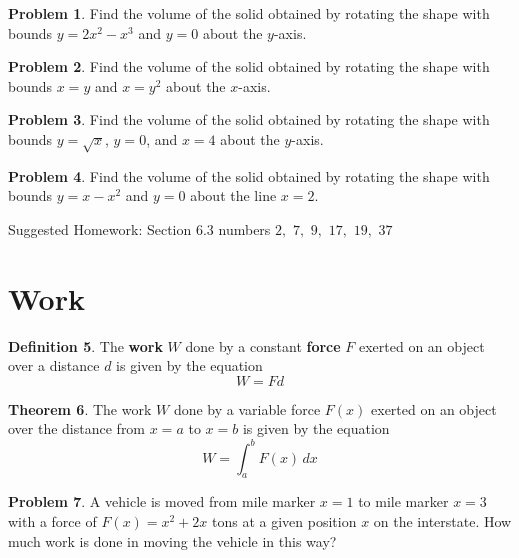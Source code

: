 \documentclass[letterpaper, twoside, 12pt]{book}
\theoremstyle{definition}
\newtheorem{theorem}{Theorem}
\theoremstyle{definition}
\newtheorem{definition}[theorem]{Definition}
\newtheorem{problem}[theorem]{Problem}
\begin{document}
\begin{problem}
 Find the volume of the solid obtained by rotating the shape with bounds
 $y = 2x^2-x^3$ and $y = 0$ about the $y$-axis.
\end{problem}

\vfill

\begin{problem}
 Find the volume of the solid obtained by rotating the shape with bounds
 $x = y$ and $x = y^2$ about the $x$-axis.
\end{problem}

\vfill

\newpage

\begin{problem}
 Find the volume of the solid obtained by rotating the shape with bounds
 $y = \sqrt{x}$, $y=0$, and $x=4$ about the $y$-axis.
\end{problem}

\vfill

\begin{problem}
 Find the volume of the solid obtained by rotating the shape with bounds
 $y = x-x^2$ and $y = 0$ about the line $x=2$.
\end{problem}

\vfill

Suggested Homework: Section $6.3$ numbers $2,$ $7,$ $9,$ $17,$ $19,$ $37$


\newpage

\section{Work}

\begin{definition}
  The \textbf{work} $W$ done by a constant \textbf{force} $F$ exerted on
  an object over a distance $d$ is given by the equation \[W=Fd\]
\end{definition}

\begin{theorem}
  The work $W$ done by a variable force $F(x)$ exerted on an object over the
  distance from $x=a$ to $x=b$ is given by the equation \[W=\int_a^b F(x)\,dx\]
\end{theorem}

\begin{problem}
  A vehicle is moved from mile marker $x=1$ to mile marker $x=3$
  with a force of $F(x)=x^2+2x$ tons at a given position $x$ on the
  interstate. How much work is done in moving the vehicle in this way?
\end{problem}
\end{document}
